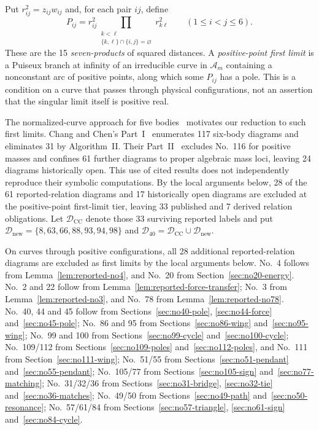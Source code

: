 \documentclass[11pt]{amsart}
\theoremstyle{remark}
\newcommand{\A}{\mathcal A}
\newcommand{\D}{\mathcal D}
\begin{document}
Put $r_{ij}^2=z_{ij}w_{ij}$ and, for each pair $ij$, define
\begin{equation}\label{eq:sevenproducts}
P_{ij}=r_{ij}^2\prod_{\substack{k<\ell\\\{k,\ell\}\cap\{i,j\}=\varnothing}}r_{k\ell}^2\qquad(1\le i<j\le6).
\end{equation}
These are the 15 \emph{seven-products} of squared distances. A \emph{positive-point first limit} is a Puiseux branch at infinity of an irreducible curve in $\A_m$ containing a nonconstant arc of positive points, along which some $P_{ij}$ has a pole. This is a condition on a curve that passes through physical configurations, not an assertion that the singular limit itself is positive real.

The normalized-curve approach for five bodies~\cite{CTFive} motivates our reduction to such first limits. Chang and Chen's Part~I~\cite{CCI} enumerates 117 six-body diagrams and eliminates 31 by Algorithm~II. Their Part~II~\cite[Theorem~6.1, Sections~6.2--6.12 and Table~6.1]{CCII} excludes No.~116 for positive masses and confines 61 further diagrams to proper algebraic mass loci, leaving 24 diagrams historically open. This use of cited results does not independently reproduce their symbolic computations. By the local arguments below, 28 of the 61 reported-relation diagrams and 17 historically open diagrams are excluded at the positive-point first-limit tier, leaving 33 published and 7 derived relation obligations. Let $\D_{\mathrm{CC}}$ denote those 33 surviving reported labels and put $\D_{\mathrm{new}}=\{8,63,66,88,93,94,98\}$ and $\D_{40}=\D_{\mathrm{CC}}\cup\D_{\mathrm{new}}$.

On curves through positive configurations, all 28 additional reported-relation diagrams are excluded as first limits by the local arguments below. No.~4 follows from Lemma~\ref{lem:reported-no4}, and No.~20 from Section~\ref{sec:no20-energy}. No.~2 and 22 follow from Lemma~\ref{lem:reported-force-transfer}; No.~3 from Lemma~\ref{lem:reported-no3}, and No.~78 from Lemma~\ref{lem:reported-no78}. No.~40, 44 and 45 follow from Sections~\ref{sec:no40-pole}, \ref{sec:no44-force} and~\ref{sec:no45-pole}; No.~86 and 95 from Sections~\ref{sec:no86-wing} and~\ref{sec:no95-wing}; No.~99 and 100 from Sections~\ref{sec:no99-cycle} and~\ref{sec:no100-cycle}; No.~109/112 from Sections~\ref{sec:no109-poles} and~\ref{sec:no112-poles}, and No.~111 from Section~\ref{sec:no111-wing}; No.~51/55 from Sections~\ref{sec:no51-pendant} and~\ref{sec:no55-pendant}; No.~105/77 from Sections~\ref{sec:no105-sign} and~\ref{sec:no77-matching}; No.~31/32/36 from Sections~\ref{sec:no31-bridge}, \ref{sec:no32-tie} and~\ref{sec:no36-matches}; No.~49/50 from Sections~\ref{sec:no49-path} and~\ref{sec:no50-resonance}; No.~57/61/84 from Sections~\ref{sec:no57-triangle}, \ref{sec:no61-sign} and~\ref{sec:no84-cycle}.
\end{document}
